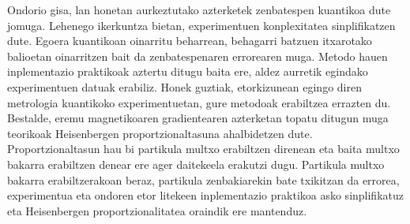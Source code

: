 Ondorio gisa, lan honetan aurkeztutako azterketek zenbatespen kuantikoa dute jomuga.
Lehenego ikerkuntza bietan, experimentuen konplexitatea sinplifikatzen dute. Egoera kuantikoan oinarritu beharrean, behagarri batzuen itxarotako balioetan oinarritzen bait da zenbatespenaren errorearen muga.
Metodo hauen inplementazio praktikoak aztertu ditugu baita ere, aldez aurretik egindako experimentuen datuak erabiliz.
Honek guztiak, etorkizunean egingo diren metrologia kuantikoko experimentuetan, gure metodoak erabiltzea errazten du.
Bestalde, eremu magnetikoaren gradientearen azterketan topatu ditugun muga teorikoak Heisenbergen proportzionaltasuna ahalbidetzen dute.
Proportzionaltasun hau bi partikula multxo erabiltzen direnean eta baita multxo bakarra erabiltzen denear ere ager daitekeela erakutzi dugu.
Partikula multxo bakarra erabiltzerakoan beraz, partikula zenbakiarekin bate txikitzan da errorea, experimentua eta ondoren etor litekeen inplementazio praktikoa asko sinplifikatuz eta Heisenbergen proportzionalitatea oraindik ere mantenduz.
